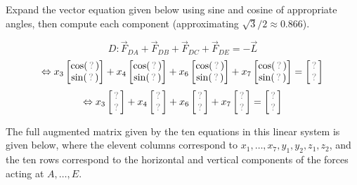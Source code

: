 \begin{applicationActivities}
\begin{activity}{10}
Expand the vector equation given below using sine and cosine of appropriate angles,
then compute each component (approximating \(\sqrt{3}/2\approx 0.866\)).

\drawtruss{\trussStrutVariables}

\[
D:\vec F_{DA}+\vec F_{DB}+\vec F_{DC}+\vec F_{DE}=-\vec L
\]
\[
\Leftrightarrow
x_3\begin{bmatrix}\cos(\unknown)\\\sin(\unknown)\end{bmatrix}+
x_4\begin{bmatrix}\cos(\unknown)\\\sin(\unknown)\end{bmatrix}+
x_6\begin{bmatrix}\cos(\unknown)\\\sin(\unknown)\end{bmatrix}+
x_7\begin{bmatrix}\cos(\unknown)\\\sin(\unknown)\end{bmatrix}=
\begin{bmatrix}\unknown\\\unknown\end{bmatrix}
\]
\[
\Leftrightarrow
x_3\begin{bmatrix}\unknown\\\unknown\end{bmatrix}+
x_4\begin{bmatrix}\unknown\\\unknown\end{bmatrix}+
x_6\begin{bmatrix}\unknown\\\unknown\end{bmatrix}+
x_7\begin{bmatrix}\unknown\\\unknown\end{bmatrix}=
\begin{bmatrix}\unknown\\\unknown\end{bmatrix}
\]

\end{activity}

\begin{observation}
The full augmented matrix given by the ten equations in this linear system
is given below, where the elevent columns correspond to \(x_1,\dots,x_7,y_1,y_2,z_1,z_2\),
and the ten rows correspond to the horizontal and vertical components of the
forces acting at \(A,\dots,E\).


\end{observation}
\end{applicationActivities}
